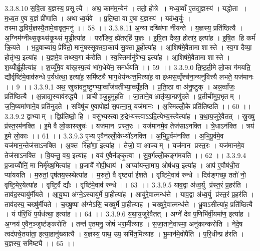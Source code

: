3.3.8.10
स॒वि॒ता य॒ज्ञस्य॒ प्रसूत्यै । अथ॒ काम॑म॒न्येन॑ । ततो॒ होत्रे । मध्य॒व्वाँ ए॒तद्य॒ज्ञस्य॑ । यद्धोता । म॒ध्य॒त ए॒व य॒ज्ञं प्री॑णाति । अथाध्व॒र्यवे । प्र॒ति॒ष्ठा वा ए॒षा य॒ज्ञस्य॑ । यद॑ध्व॒र्युः । तस्माद्धविर्य॒ज्ञस्यै॒तामे॒वावृत॒मनु॑ ।। 58 ।।
3.3.8.11
अ॒न्या दख्षि॑णा नीयन्ते । य॒ज्ञस्य॒ प्रति॑ष्ठित्यै । अ॒ग्निम॑ग्नीथ्स॒कृथ्स॑कृ॒थ्सं मृ॒ड्ढीत्या॑ह । परा॑ङिव॒ ह्ये॑तर्‌हि॑ य॒ज्ञः । इ॒षि॒ता दैव्या॒ होता॑र॒ इत्या॑ह । इ॒षि॒त हि कर्म॑ क्रि॒यते । भ॒द्र॒वाच्या॑य॒ प्रेषि॑तो॒ मानु॑षस्सूक्तवा॒काय॑ सू॒क्ता ब्रू॒हीत्या॑ह । आ॒शिष॑मे॒वैतामा शास्ते । स्व॒गा दैव्या॒ होतृ॑भ्य॒ इत्या॑ह । य॒ज्ञमे॒व तथ्स्व॒गा क॑रोति । स्व॒स्तिर्मानु॑षेभ्य॒ इत्या॑ह । आ॒शिष॑मे॒वैतामा शास्ते । श॒य्योँर्ब्रू॒हीत्या॑ह । श॒य्युँमे॒व बा॑र्‌हस्प॒त्यं भा॑ग॒धेये॑न॒ सम॑र्धयति ।। 59 ।।
3.3.9.0
ति॒ष्ठ॒ती॒मे लो॒का ग॑मयति॒ द्यौर्वृष्टि॑मे॒वाव॑रुन्धे प॒र्यध॑त्था॒ इत्या॑ह॒ समि॑ष्ट्यै भाग॒धेय॑न्धत्त॒मित्या॑ह॒ वा इ॑ध्मस॒व्वृँश्च॑ना॒न्यनु॑वित्त्यै लभते॒ यज॑मानः ।। 9 ।।
3.3.9.1
अथ॒ स्रुचा॑वनु॒ष्टुग्भ्या॒व्वाँज॑वतीभ्या॒व्व्यूँ॑हति । प्र॒ति॒ष्ठा वा अ॑नु॒ष्टुक् । अन्न॒व्वाँजः॒ प्रति॑ष्ठित्यै । अ॒न्नाद्य॒स्याव॑रुद्ध्यै । प्राचीञ्जु॒हूमू॑हति । जा॒ताने॒व भ्रातृ॑व्या॒न्प्रणु॑दते । प्र॒तीची॑मुप॒भृतम् । ज॒नि॒ष्यमा॑णाने॒व प्रति॑नुदते । सविषू॑च ए॒वापोह्य॑ स॒पत्ना॒न्॒ यज॑मानः । अ॒स्मिल्लोँ॒के प्रति॑तिष्ठति ।। 60 ।।
3.3.9.2
द्वाभ्याम् । द्विप्र॑तिष्ठो॒ हि । वसु॑भ्यस्त्वा रु॒द्रेभ्य॑स्त्वाऽऽदि॒त्येभ्य॒स्त्वेत्या॑ह । य॒था॒य॒जुरे॒वैतत् । स्रु॒ख्षु प्र॑स्त॒रम॑नक्ति । इ॒मे वै लो॒कास्स्रुचः॑ । यज॑मान प्रस्त॒रः । यज॑मानमे॒व तेज॑साऽनक्ति । त्रे॒धाऽन॑क्ति । त्रय॑ इ॒मे लो॒काः ।। 61 ।।
3.3.9.3
ए॒भ्य ए॒वैन॑ल्लोँ॒केभ्यो॑ऽनक्ति । अ॒भि॒पू॒र्वम॑नक्ति । अ॒भि॒पू॒र्वमे॒व यज॑मान॒न्तेज॑साऽनक्ति । अ॒क्त रिहा॑णा॒ इत्या॑ह । तेजो॒ वा आज्यम् । यज॑मान प्रस्त॒रः । यज॑मानमे॒व तेज॑साऽनक्ति । वि॒यन्तु॒ वय॒ इत्या॑ह । वय॑ ए॒वैन॑ङ्कृ॒त्वा । सु॒व॒र्गल्लोँ॒कङ्ग॑मयति ।। 62 ।।
3.3.9.4
प्र॒जाय्योँनिं॒ मा निर्मृ॑ख्ष॒मित्या॑ह । प्र॒जायै॑ गोपी॒थाय॑ । आप्या॑यन्ता॒माप॒ ओष॑धय॒ इत्या॑ह । आप॑ ए॒वौष॑धी॒रा प्या॑ययति । म॒रुतां॒ पृष॑तय॒स्स्थेत्या॑ह । म॒रुतो॒ वै वृष्ट्या॑ ईशते । वृष्टि॑मे॒वाव॑ रुन्धे । दिव॑ङ्गच्छ॒ ततो॑ नो॒ वृष्टि॒मेर॒येत्या॑ह । वृष्टि॒र्वै द्यौः । वृष्टि॑मे॒वाव॑ रुन्धे ।। 63 ।।
3.3.9.5
याव॒द्वा अ॑ध्व॒र्यु प्र॑स्त॒रं प्र॒हर॑ति । ताव॑द॒स्यायु॑र्मीयते । आ॒यु॒ष्पा अ॑ग्ने॒ऽस्यायु॑र्मे पा॒हीत्या॑ह । आयु॑रे॒वात्मन्ध॑त्ते । याव॒द्वा अ॑ध्व॒र्यु प्र॑स्त॒रं प्र॒हर॑ति । ताव॑दस्य॒ चख्षु॑र्मीयते । च॒ख्षु॒ष्पा अ॑ग्नेऽसि॒ चख्षु॑र्मे पा॒हीत्या॑ह । चख्षु॑रे॒वात्मन्ध॑त्ते । ध्रु॒वाऽसीत्या॑ह॒ प्रति॑ष्ठित्यै । यं प॑रि॒धिं प॒र्यध॑त्था॒ इत्या॑ह ।। 64 ।।
3.3.9.6
य॒था॒य॒जुरे॒वैतत् । अग्ने॑ देव प॒णिभि॑र्वी॒यमा॑ण॒ इत्या॑ह । अ॒ग्नय॑ ए॒वैन॒ञ्जुष्ट॑ङ्करोति । तन्त॑ ए॒तमनु॒ जोषं॑ भरा॒मीत्या॑ह । स॒जा॒ताने॒वास्मा॒ अनु॑कान्करोति । नेदे॒ष त्वद॑पचे॒तया॑ता॒ इत्या॒हानु॑ख्यात्यै । य॒ज्ञस्य॒ पाथ॒ उप॒ समि॑त॒मित्या॑ह । भू॒मान॑मे॒वोपै॑ति । प॒रि॒धीन्प्र ह॑रति । य॒ज्ञस्य॒ समि॑ष्ट्यै ।। 65 ।।
